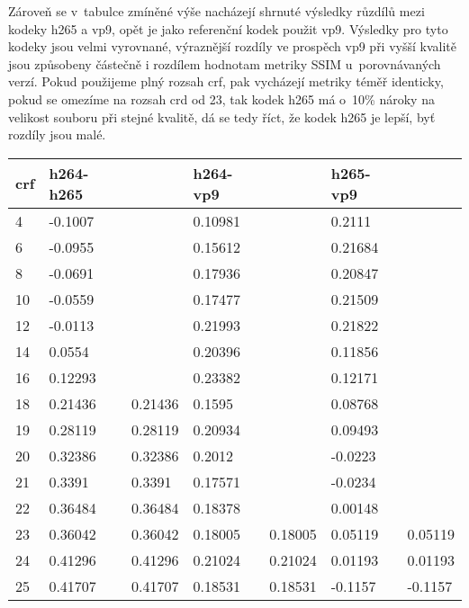 \documentclass[thesis=M,czech]{FITthesis}[2016/06/26]
\begin{document}
Zároveň se v~tabulce zmíněné výše nacházejí shrnuté výsledky růzdílů mezi kodeky h265 a vp9, opět je jako referenční kodek použit vp9. Výsledky pro tyto kodeky jsou velmi vyrovnané, výraznější rozdíly ve prospěch vp9 při vyšší kvalitě jsou způsobeny částečně i rozdílem hodnotam metriky SSIM u~porovnávaných verzí. Pokud použijeme plný rozsah crf, pak vycházejí metriky téměř identicky, pokud se omezíme na rozsah crd od 23, tak kodek h265 má o~10\% nároky na velikost souboru při stejné kvalitě, dá se tedy říct, že kodek h265 je lepší, byť rozdíly jsou malé. 
\begin{table}[]
\centering
\begin{tabular}{|l|l|l|l|l|l|l|}
\hline
crf    & h264-h265 &         & h264-vp9 &         & h265-vp9 &         \\ \hline
4      & -0.1007   &         & 0.10981  &         & 0.2111   &         \\ \hline
6      & -0.0955   &         & 0.15612  &         & 0.21684  &         \\ \hline
8      & -0.0691   &         & 0.17936  &         & 0.20847  &         \\ \hline
10     & -0.0559   &         & 0.17477  &         & 0.21509  &         \\ \hline
12     & -0.0113   &         & 0.21993  &         & 0.21822  &         \\ \hline
14     & 0.0554    &         & 0.20396  &         & 0.11856  &         \\ \hline
16     & 0.12293   &         & 0.23382  &         & 0.12171  &         \\ \hline
18     & 0.21436   & 0.21436 & 0.1595   &         & 0.08768  &         \\ \hline
19     & 0.28119   & 0.28119 & 0.20934  &         & 0.09493  &         \\ \hline
20     & 0.32386   & 0.32386 & 0.2012   &         & -0.0223  &         \\ \hline
21     & 0.3391    & 0.3391  & 0.17571  &         & -0.0234  &         \\ \hline
22     & 0.36484   & 0.36484 & 0.18378  &         & 0.00148  &         \\ \hline
23     & 0.36042   & 0.36042 & 0.18005  & 0.18005 & 0.05119  & 0.05119 \\ \hline
24     & 0.41296   & 0.41296 & 0.21024  & 0.21024 & 0.01193  & 0.01193 \\ \hline
25     & 0.41707   & 0.41707 & 0.18531  & 0.18531 & -0.1157  & -0.1157 \\ \hline

\end{tabular}
\end{table}
\end{document}
